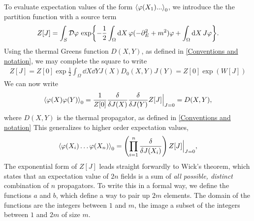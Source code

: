 
To evaluate expectation values of the form $\ex{\varphi(X_1) ... }_0$, we introduce the the partition function with a source term
\begin{align}
    Z[J] = \int_S \mathcal{D} \varphi \, \exp{
        - \frac{1}{2} \int_\Omega \dd X \, \varphi (-\partial_E^2 + m^2) \varphi
        + \int_\Omega \dd X \, J \varphi
    }.
\end{align}
Using the thermal Greens function $D(X, Y)$, as defined in \autoref{Conventions and notation}, we may complete the square to write
\begin{align}
    Z[J] = Z[0]\exp{\frac{1}{2} \int_{\Omega} \dd X \dd Y J(X) D_0(X, Y) J(Y)}
    = Z[0] \exp(W[J])
\end{align}
We can now write
\begin{equation}
    \ex{\varphi(X)\varphi(Y)}_0 
    = \frac{1}{Z[0]}
    \frac{\delta}{\delta J(X)} \frac{\delta}{\delta J(Y)} 
    Z[J] \Big|_{J=0} 
    = D(X, Y),
\end{equation}
where $D(X, Y)$ is the thermal propagator, as defined in \autoref{Conventions and notation}
This generalizes to higher order expectation values,
\begin{equation}
    \ex{\varphi(X_i) \dots \varphi(X_n)}_0
    = \left(\prod_{i=1}^n \frac{\delta}{\delta J(X_i)}\right) 
    Z[J] \Big|_{J=0},
\end{equation}
The exponential form of $Z[J]$ leads straight forwardly to Wick's theorem, which states that an expectation value of $2n$ fields is a sum of \emph{all possible, distinct} combination of $n$ propagators.
To write this in a formal way, we define the functions $a$ and $b$, which define a way to pair up $2m$ elements.
The domain of the functions are the integers between $1$ and $m$, the image a subset of the integers between $1$ and $2m$ of size $m$.

